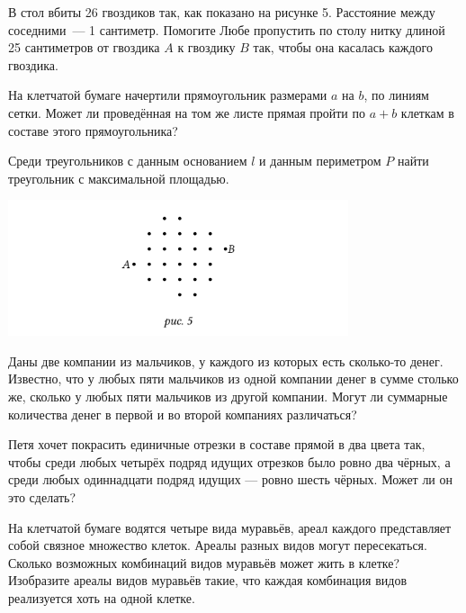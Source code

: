 \begin{itemize}
\itA В стол вбиты 26 гвоздиков так, как показано на рисунке 5. Расстояние между соседними~— 1 сантиметр. Помогите Любе пропустить по столу нитку длиной 25 сантиметров от гвоздика $A$ к гвоздику $B$ так, чтобы она касалась каждого гвоздика.

\itB На клетчатой бумаге начертили прямоугольник размерами $a$ на $b$, по линиям сетки. Может ли проведённая на том же листе прямая пройти по $a+b$ клеткам в составе этого прямоугольника?

\itC Среди треугольников с данным основанием $l$ и данным периметром $P$ найти треугольник с максимальной площадью.
\end{itemize}

\begin{center}
  \includegraphics[width=10cm]{stats/2016/Figures/Gvozdiks.png}
\end{center}

\begin{itemize}
\itA Даны две компании из мальчиков, у каждого из которых есть сколько-то денег. Известно, что у любых пяти мальчиков из одной компании денег в сумме столько же, сколько у любых пяти мальчиков из другой компании. Могут ли суммарные количества денег в первой и во второй компаниях различаться?

\itB Петя хочет покрасить единичные отрезки в составе прямой в два цвета так, чтобы среди любых четырёх подряд идущих отрезков было ровно два чёрных, а среди любых одиннадцати подряд идущих — ровно шесть чёрных. Может ли он это сделать?

\itC На клетчатой бумаге водятся четыре вида муравьёв, ареал каждого представляет собой связное множество клеток. Ареалы разных видов могут пересекаться. Сколько возможных комбинаций видов муравьёв может жить в клетке? Изобразите ареалы видов муравьёв такие, что каждая комбинация видов реализуется хоть на одной клетке.
\end{itemize}

